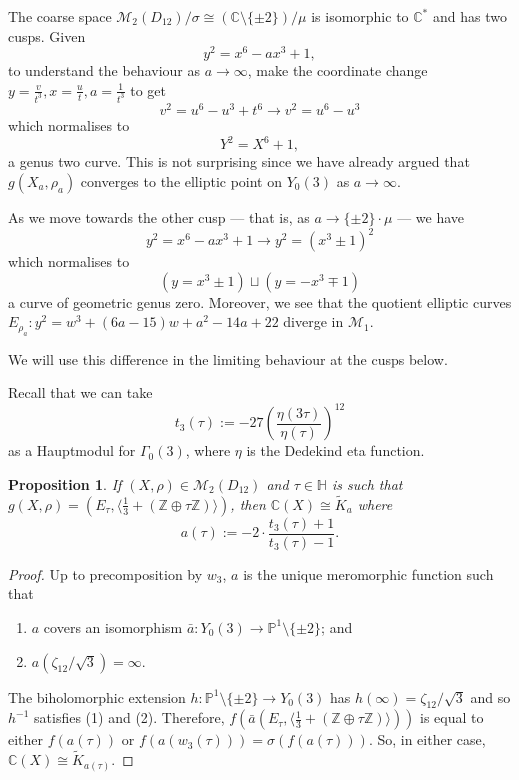 \documentclass[a4paper,11pt]{amsart}
\numberwithin{equation}{section}
\numberwithin{figure}{section}
\numberwithin{table}{section}
\newtheorem{proposition}[theorem]{Proposition}
\newcommand{\C}{\mathbb{C}}
\newcommand{\Z}{\mathbb{Z}}
\begin{document}
The coarse space $\mathcal{M}_{2}(D_{12})/\sigma\cong(\C\setminus\{\pm 2\})/\mu$ is isomorphic to $\C^{*}$ and has two cusps. Given
\[y^2 = x^6-ax^3+1,\]
to understand the behaviour as $a\to\infty$, make the coordinate change $y = \frac{v}{t^3}, x = \frac{u}{t}, a = \frac{1}{t^3}$ to get
\[v^2 = u^6 - u^3 + t^6 \to v^2 = u^6-u^3\]
which normalises to
\[Y^2 = X^6+1,\]
a genus two curve. This is not surprising since we have already argued that $g(X_{a},\rho_{a})$ converges to the elliptic point on $Y_{0}(3)$ as $a\to \infty$.

As we move towards the other cusp --- that is, as $a\to\{\pm2\}\cdot\mu$ --- we have
\[y^2= x^6-ax^3+1\to y^2 = (x^3\pm 1)^2\]
which normalises to
\[(y = x^3\pm 1)\sqcup (y = -x^3\mp 1)\]
a curve of geometric genus zero. Moreover, we see that the quotient elliptic curves $E_{\rho_{a}}:y^2 = w^3+(6a-15)w+a^2-14a+22$ diverge in $\mathcal{M}_{1}$.

We will use this difference in the limiting behaviour at the cusps below.

Recall that we can take
\[t_{3}(\tau):=-27\left(\frac{\eta(3\tau)}{\eta(\tau)}\right)^{12}\]
as a Hauptmodul for $\Gamma_{0}(3)$, where $\eta$ is the Dedekind eta function.

\begin{proposition}
    If $(X,\rho)\in\mathcal{M}_{2}(D_{12})$ and $\tau\in\mathbb{H}$ is such that $g(X,\rho) = (E_{\tau},\langle\frac{1}{3}+(\Z\oplus\tau\Z)\rangle)$, then $\C(X)\cong\widetilde{K}_{a}$ where
    \[a(\tau):= -2\cdot\frac{t_{3}(\tau)+1}{t_{3}(\tau)-1}.\]
\end{proposition}

\begin{proof}
    Up to precomposition by $w_{3}$, $a$ is the unique meromorphic function such that
    \begin{enumerate}
        \item $a$ covers an isomorphism $\bar{a}:Y_{0}(3)\to\mathbb{P}^{1}\setminus\{\pm 2\}$; and
        \item $a(\zeta_{12}/\sqrt{3}) = \infty.$
    \end{enumerate}
    The biholomorphic extension $h:\mathbb{P}^{1}\setminus\{\pm 2\}\to Y_{0}(3)$ has $h(\infty) = \zeta_{12}/\sqrt{3}$ and so $h^{-1}$ satisfies (1) and (2). Therefore, $f(\bar{a}(E_{\tau},\langle\frac{1}{3}+(\Z\oplus\tau\Z)\rangle))$ is equal to either $f(a(\tau))$ or $f(a(w_3(\tau))) = \sigma(f(a(\tau)))$. So, in either case, $\C(X)\cong\widetilde{K}_{a(\tau)}$.
\end{proof}
\end{document}
